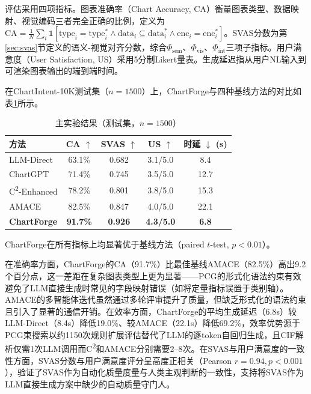 评估采用四项指标。图表准确率（Chart Accuracy, CA）衡量图表类型、数据映射、视觉编码三者完全正确的比例，定义为$\text{CA} = \frac{1}{N}\sum_i \mathbb{1}[\text{type}_i = \text{type}^*_i \land \text{data}_i \subseteq \text{data}^*_i \land \text{enc}_i = \text{enc}^*_i]$。SVAS分数为第\ref{sec:svas}节定义的语义-视觉对齐分数，综合$\Phi_{\text{sem}}$、$\Phi_{\text{vis}}$、$\Phi_{\text{int}}$三项子指标。用户满意度（User Satisfaction, US）采用5分制Likert量表。生成延迟指从用户NL输入到可渲染图表输出的端到端时间。


在ChartIntent-10K测试集（$n=1500$）上，ChartForge与四种基线方法的对比如表\ref{tab:main_results}所示。

\begin{table}[H]
\centering
\caption{主实验结果（测试集，$n = 1500$）}
\label{tab:main_results}
\begin{tabular}{l|c|c|c|c}
\toprule
\textbf{方法} & \textbf{CA $\uparrow$} & \textbf{SVAS $\uparrow$} & \textbf{US $\uparrow$} & \textbf{时延 $\downarrow$ (s)} \\
\midrule
LLM-Direct   & 63.1\% & 0.682 & 3.1/5.0 & 8.4 \\
ChartGPT     & 71.4\% & 0.745 & 3.5/5.0 & 12.7 \\
C\textsuperscript{2}-Enhanced & 78.2\% & 0.801 & 3.8/5.0 & 15.3 \\
AMACE        & 82.5\% & 0.847 & 4.0/5.0 & 22.1 \\
\midrule
\textbf{ChartForge} & \textbf{91.7\%} & \textbf{0.926} & \textbf{4.3/5.0} & \textbf{6.8} \\
\bottomrule
\end{tabular}
\end{table}

ChartForge在所有指标上均显著优于基线方法（paired $t$-test, $p < 0.01$）。

在准确率方面，ChartForge的CA（91.7\%）比最佳基线AMACE（82.5\%）高出9.2个百分点，这一差距在复杂图表类型上更为显著——PCG的形式化语法约束有效避免了LLM直接生成时常见的字段映射错误（如将定量指标误置于类别轴）。AMACE的多智能体迭代虽然通过多轮评审提升了质量，但缺乏形式化的语法约束且引入了显著的通信开销。在效率方面，ChartForge的平均生成延迟（6.8s）较LLM-Direct（8.4s）降低19.0\%、较AMACE（22.1s）降低69.2\%，效率优势源于PCG束搜索以约1150次规则扩展评估替代了LLM的逐token自回归生成，且CIF解析仅需1次LLM调用而C\textsuperscript{2}和AMACE分别需要2--8次。在SVAS与用户满意度的一致性方面，SVAS分数与用户满意度评分呈高度正相关（Pearson $r = 0.94, p < 0.001$），验证了SVAS作为自动化质量度量与人类主观判断的一致性，支持将SVAS作为LLM直接生成方案中缺少的自动质量守门人。


